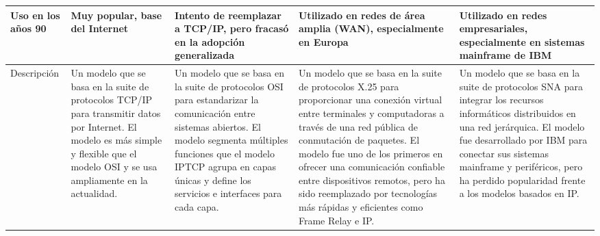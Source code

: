 \begin{longtable}{|>{\raggedright\arraybackslash}m{2.4cm}|>{\raggedright\arraybackslash}m{2.8cm}|>{\raggedright\arraybackslash}m{2.8cm}|>{\raggedright\arraybackslash}m{2.8cm}|>{\raggedright\arraybackslash}m{2.8cm}|}
      Uso en los años 90      & Muy popular, base del Internet                                                                                                                                                         & Intento de reemplazar a TCP/IP, pero fracasó en la adopción generalizada                                                                                                                                                                             & Utilizado en redes de área amplia (WAN), especialmente en Europa                                                                                                                                                                                                                                                                                                                 & Utilizado en redes empresariales, especialmente en sistemas mainframe de IBM                                                                                                                                                                                                           \\ \hline
      Descripción             & Un modelo que se basa en la suite de protocolos TCP/IP para transmitir datos por Internet. El modelo es más simple y flexible que el modelo OSI y se usa ampliamente en la actualidad. & Un modelo que se basa en la suite de protocolos OSI para estandarizar la comunicación entre sistemas abiertos. El modelo segmenta múltiples funciones que el modelo IPTCP agrupa en capas únicas y define los servicios e interfaces para cada capa. & Un modelo que se basa en la suite de protocolos X.25 para proporcionar una conexión virtual entre terminales y computadoras a través de una red pública de conmutación de paquetes. El modelo fue uno de los primeros en ofrecer una comunicación confiable entre dispositivos remotos, pero ha sido reemplazado por tecnologías más rápidas y eficientes como Frame Relay e IP. & Un modelo que se basa en la suite de protocolos SNA para integrar los recursos informáticos distribuidos en una red jerárquica. El modelo fue desarrollado por IBM para conectar sus sistemas mainframe y periféricos, pero ha perdido popularidad frente a los modelos basados en IP. \\ \hline
\end{longtable}
\endgroup


